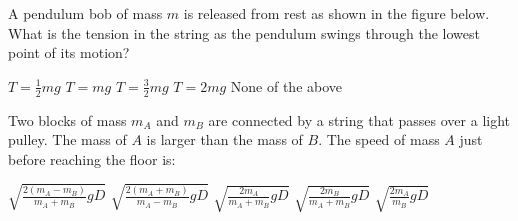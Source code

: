 \documentclass{../../../oss-classkick-exam}
\begin{document}
\begin{multicols*}{2}
\begin{questions}
    \question A pendulum bob of mass $m$ is released from rest as shown in the
    figure below. What is the tension in the string as the pendulum swings
    through the lowest point of its motion?
    \begin{center}
    \end{center}
    \begin{choices}
      \choice $\displaystyle T=\frac{1}{2}mg$
      \choice $T=mg$
      \choice $\displaystyle T=\frac{3}{2}mg$
      \choice $T=2mg$
      \choice None of the above
    \end{choices}
    
    \question Two blocks of mass $m_A$ and $m_B$ are connected by a string that
    passes over a light pulley. The mass of $A$ is larger than the mass of $B$.
    The speed of mass $A$ just before reaching the floor is:
    \begin{center}
    \end{center}
    \begin{choices}
      \choice $\displaystyle\sqrt{\frac{2(m_A-m_B)}{m_A+m_B}gD}$
      \choice $\displaystyle\sqrt{\frac{2(m_A+m_B)}{m_A-m_B}gD}$
      \choice $\displaystyle\sqrt{\frac{2m_A}{m_A+m_B}gD}$
      \choice $\displaystyle\sqrt{\frac{2m_B}{m_A+m_B}gD}$
      \choice $\displaystyle\sqrt{\frac{2m_A}{m_B}gD}$
    \end{choices}
    \columnbreak


\end{questions}
\end{multicols*}
\end{document}
